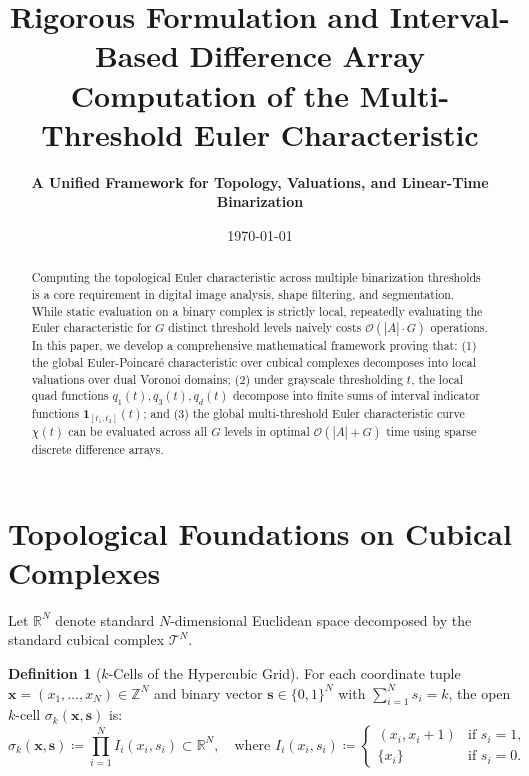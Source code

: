 \documentclass[11pt,a4paper]{article}
\title{\textbf{Rigorous Formulation and Interval-Based Difference Array Computation of the Multi-Threshold Euler Characteristic}}
\author{\textbf{A Unified Framework for Topology, Valuations, and Linear-Time Binarization}}
\date{\today}
\theoremstyle{plain}
\theoremstyle{definition}
\newtheorem{definition}[theorem]{Definition}
\theoremstyle{remark}
\newcommand{\R}{\mathbb{R}}
\newcommand{\Z}{\mathbb{Z}}
\newcommand{\T}{\mathcal{T}}
\newcommand{\indicator}{\mathbf{1}}
\begin{document}
\maketitle

\begin{abstract}
Computing the topological Euler characteristic across multiple binarization thresholds is a core requirement in digital image analysis, shape filtering, and segmentation. While static evaluation on a binary complex is strictly local, repeatedly evaluating the Euler characteristic for $G$ distinct threshold levels naively costs $\mathcal{O}(|A| \cdot G)$ operations. In this paper, we develop a comprehensive mathematical framework proving that: (1) the global Euler-Poincaré characteristic over cubical complexes decomposes into local valuations over dual Voronoi domains; (2) under grayscale thresholding $t$, the local quad functions $q_1(t), q_3(t), q_d(t)$ decompose into finite sums of interval indicator functions $\indicator_{[t_1, t_2]}(t)$; and (3) the global multi-threshold Euler characteristic curve $\chi(t)$ can be evaluated across all $G$ levels in optimal $\mathcal{O}(|A| + G)$ time using sparse discrete difference arrays.
\end{abstract}

\section{Topological Foundations on Cubical Complexes}

Let $\R^N$ denote standard $N$-dimensional Euclidean space decomposed by the standard cubical complex $\T^N$.

\begin{definition}[$k$-Cells of the Hypercubic Grid]
For each coordinate tuple $\mathbf{x} = (x_1, \dots, x_N) \in \Z^N$ and binary vector $\mathbf{s} \in \{0, 1\}^N$ with $\sum_{i=1}^N s_i = k$, the open $k$-cell $\sigma_k(\mathbf{x}, \mathbf{s})$ is:
\begin{equation}
    \sigma_k(\mathbf{x}, \mathbf{s}) \coloneqq \prod_{i=1}^N I_i(x_i, s_i) \subset \R^N, \quad \text{where } I_i(x_i, s_i) \coloneqq \begin{cases} (x_i, x_i + 1) & \text{if } s_i = 1, \\ \{x_i\} & \text{if } s_i = 0. \end{cases}
\end{equation}
\end{definition}
\end{document}
